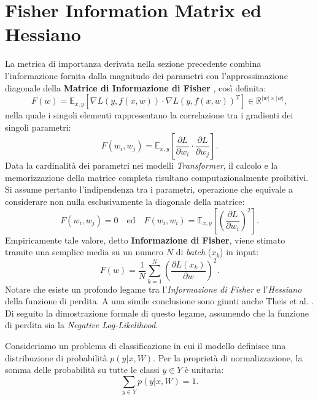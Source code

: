\section{Fisher Information Matrix ed Hessiano}
\label{section:fisher_hessian}
La metrica di importanza derivata nella sezione precedente combina
l'informazione fornita dalla magnitudo dei parametri con l'approssimazione
diagonale della \textbf{Matrice di Informazione di Fisher}
\cite{molchanov2019importanceestimationneuralnetwork,
    theis2018fastergazepredictiondense}, così definita:
\begin{equation}
    F(w) = \mathbb{E}_{x,y} \left[ \nabla L(y, f(x,w)) \cdot \nabla L(y, f(x,w))^T \right] \in \mathbb{R}^{|w| \times |w|},
\end{equation}
nella quale i singoli elementi rappresentano la correlazione tra i gradienti dei singoli parametri:
\begin{equation}
    F(w_i, w_j) = \mathbb{E}_{x,y} \left[ \frac{\partial L}{\partial w_i} \cdot \frac{\partial L}{\partial w_j} \right].
\end{equation}
Data la cardinalità dei parametri nei modelli \textit{Transformer}, il calcolo e la memorizzazione della matrice completa risultano computazionalmente proibitivi. Si assume pertanto l'indipendenza tra i parametri, operazione che equivale a considerare non nulla esclusivamente la diagonale della matrice:
$$ F(w_i, w_j) = 0 \quad \text{ed} \quad F(w_i, w_i) = \mathbb{E}_{x,y} \left[ \left(\frac{\partial L}{\partial w_i} \right)^2 \right]. $$
Empiricamente tale valore, detto \textbf{Informazione di Fisher}, viene stimato tramite una semplice media su un numero $N$ di \textit{batch} ($x_k$) in input:
\begin{equation}
    F(w) = \frac{1}{N} \sum_{k=1}^{N} \left( \frac{\partial L(x_k)}{\partial w} \right)^2.
\end{equation}
Notare che esiste un profondo legame tra l'\textit{Informazione di Fisher} e l'\textit{Hessiano} della funzione di perdita. A una simile conclusione sono giunti anche Theis et al. \cite{theis2018fastergazepredictiondense}. Di seguito la dimostrazione formale di questo legame, assumendo che la funzione di perdita sia la \textit{Negative Log-Likelihood}. \par
Consideriamo un problema di classificazione in cui il modello definisce una
distribuzione di probabilità $p(y|x,W)$. Per la proprietà di normalizzazione,
la somma delle probabilità su tutte le classi $y \in Y$ è unitaria:
\begin{equation}
    \sum_{y \in Y} p(y|x,W) = 1.
\end{equation}
